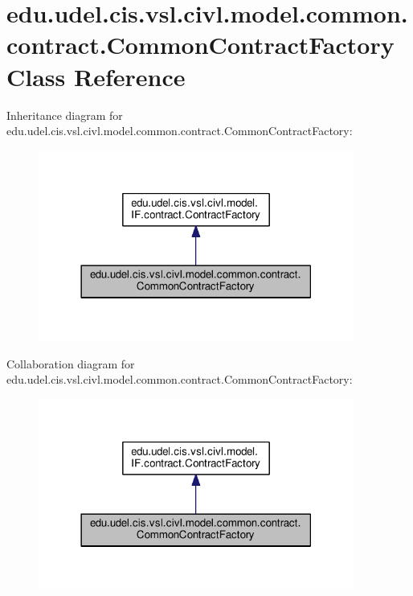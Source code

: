 \hypertarget{classedu_1_1udel_1_1cis_1_1vsl_1_1civl_1_1model_1_1common_1_1contract_1_1CommonContractFactory}{}\section{edu.\+udel.\+cis.\+vsl.\+civl.\+model.\+common.\+contract.\+Common\+Contract\+Factory Class Reference}
\label{classedu_1_1udel_1_1cis_1_1vsl_1_1civl_1_1model_1_1common_1_1contract_1_1CommonContractFactory}


Inheritance diagram for edu.\+udel.\+cis.\+vsl.\+civl.\+model.\+common.\+contract.\+Common\+Contract\+Factory\+:
\nopagebreak
\begin{figure}[H]
\begin{center}
\leavevmode
\includegraphics[width=294pt]{classedu_1_1udel_1_1cis_1_1vsl_1_1civl_1_1model_1_1common_1_1contract_1_1CommonContractFactory__inherit__graph}
\end{center}
\end{figure}


Collaboration diagram for edu.\+udel.\+cis.\+vsl.\+civl.\+model.\+common.\+contract.\+Common\+Contract\+Factory\+:
\nopagebreak
\begin{figure}[H]
\begin{center}
\leavevmode
\includegraphics[width=294pt]{classedu_1_1udel_1_1cis_1_1vsl_1_1civl_1_1model_1_1common_1_1contract_1_1CommonContractFactory__coll__graph}
\end{center}
\end{figure}
